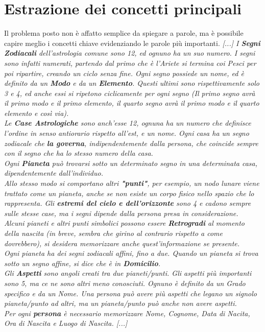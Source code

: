 \section{Estrazione dei concetti principali}
Il problema posto non è affatto semplice da spiegare a parole, ma è possibile capire meglio i concetti chiave evidenziando le parole più importanti.
\mline
\textit{
  [...] I \textbf{Segni Zodiacali} dell'astrologia comune sono 12, ed ognuno ha un suo numero. I segni sono infatti numerati, partendo dal primo che è l'Ariete si termina coi Pesci per poi ripartire, creando un ciclo senza fine. Ogni segno possiede un nome, ed è definito da un \textbf{Modo} e da un \textbf{Elemento}. Questi ultimi sono rispettivamente solo 3 e 4, ed anche essi si ripetono ciclicamente per ogni segno (Il primo segno avrà il primo modo e il primo elemento, il quarto segno avrà il primo modo e il quarto elemento e così via).\\
  Le \textbf{Case Astrologiche} sono anch'esse 12, ognuna ha un numero che definisce l'ordine in senso antiorario rispetto all'est, e un nome.
  Ogni casa ha un segno zodiacale che \textbf{la governa}, indipendentemente dalla persona, che coincide sempre con il segno che ha lo stesso numero della casa.\\
  Ogni \textbf{Pianeta} può trovarsi sotto un determinato segno in una determinata casa, dipendentemente dall'individuo.\\
  Allo stesso modo si comportano altri \textbf{"punti"}, per esempio, un nodo lunare viene trattato come un pianeta, anche se non esiste un corpo fisico nello spazio che lo rappresenta. Gli \textbf{estremi del cielo e dell'orizzonte} sono 4 e cadono sempre sulle stesse case, ma i segni dipende dalla persona presa in considerazione.\\
  Alcuni pianeti e altri punti simbolici possono essere \textbf{Retrogradi} al momento della nascita (in breve, sembra che girino al contrario rispetto a come dovrebbero), si desidera memorizzare anche quest'informazione se presente.\\
  Ogni pianeta ha dei segni zodiacali affini, fino a due. Quando un pianeta si trova sotto un segno affine, si dice che è in \textbf{Domicilio}.\\
  Gli \textbf{Aspetti} sono angoli creati tra due pianeti/punti. Gli aspetti più importanti sono 5, ma ce ne sono altri meno conosciuti. Ognuno è definito da un Grado specifico e da un Nome. Una persona può avere più aspetti che legano un signolo pianeta/punto ad altri, ma un pianeta/punto può anche non avere aspetti.\\
  Per ogni \textbf{persona} è necessario memorizzare Nome, Cognome, Data di Nacita, Ora di Nascita e Luogo di Nascita.
  [...]
}
